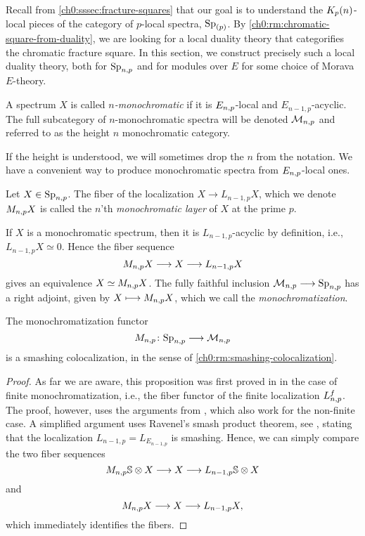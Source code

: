 Recall from \cref{ch0:sssec:fracture-squares} that our goal is to understand the ${K_p(n)}$-local pieces of the category of $p$-local spectra, $\mathrm{Sp}_{(p)}$. By \cref{ch0:rm:chromatic-square-from-duality}, we are looking for a local duality theory that categorifies the chromatic fracture square. In this section, we construct precisely such a local duality theory, both for $\mathrm{Sp}_{n,p}$ and for modules over $E$ for some choice of Morava $E$-theory. 



\begin{definition}
    \label{ch0:def:monochromatic-spectrum}
    A spectrum $X$ is called \emph{$n$-monochromatic} if it is $E_{n,p}$-local and $E_{n-1,p}$-acyclic. The full subcategory of $n$-monochromatic spectra will be denoted $\mathcal{M}_{n,p}$ and referred to as the height $n$ monochromatic category.
\end{definition}

If the height is understood, we will sometimes drop the $n$ from the notation. We have a convenient way to produce monochromatic spectra from $E_{n,p}$-local ones. 

\begin{definition}
    Let $X\in \mathrm{Sp}_{n,p}$. The fiber of the localization $X\longrightarrow L_{n-1,p}X$, which we denote $M_{n,p} X$ is called the $n$'th \emph{monochromatic layer} of $X$ at the prime $p$.
\end{definition}

\begin{remark}
    If $X$ is a monochromatic spectrum, then it is $L_{n-1,p}$-acyclic by definition, i.e., $L_{n-1,p}X\simeq 0$. Hence the fiber sequence 
    \[M_{n,p} X\longrightarrow X\longrightarrow L_{n-1,p}X\]
    gives an equivalence $X\simeq M_{n,p} X$. The fully faithful inclusion $\mathcal{M}_{n,p}\longrightarrow \mathrm{Sp}_{n,p}$ has a right adjoint, given by $X\longmapsto M_{n,p} X$, which we call the \emph{monochromatization}. 
\end{remark}

\begin{proposition}
    \label{ch0:prop:monochromatization-is-smashing}
    The monochromatization functor 
    \[M_{n,p}\colon \mathrm{Sp}_{n,p}\longrightarrow \mathcal{M}_{n,p}\] 
    is a smashing colocalization, in the sense of \cref{ch0:rm:smashing-colocalization}.
\end{proposition}
\begin{proof}
    As far we are aware, this proposition was first proved in \cite[Sec 6.3]{bousfield_1996} in the case of finite monochromatization, i.e., the fiber functor of the finite localization $L_{n,p}^f$. The proof, however, uses the arguments from \cite[2.10]{bousfield_1979_bool}, which also work for the non-finite case. A simplified argument uses Ravenel's smash product theorem, see \cite[7.5.6]{ravenel_92}, stating that the localization $L_{n-1,p} = L_{E_{n-1,p}}$ is smashing. Hence, we can simply compare the two fiber sequences
    \[M_{n,p} \mathbb{S} \otimes X \longrightarrow X \longrightarrow L_{n-1,p}\mathbb{S}\otimes X\] 
    and 
    \[M_{n,p} X\longrightarrow X\longrightarrow L_{n-1,p} X,\]
    which immediately identifies the fibers.  
\end{proof}


